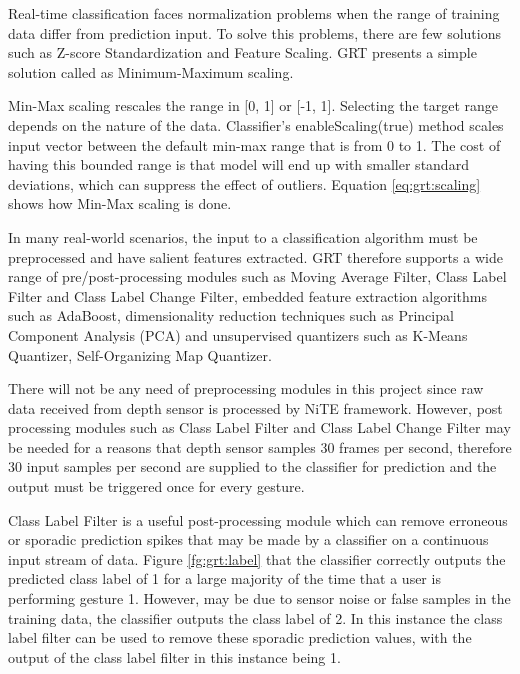 Real-time classification faces normalization problems when the range of training data differ from prediction input. To solve this problems, there are few solutions such as Z-score Standardization and Feature Scaling. GRT presents a simple solution called as Minimum-Maximum scaling.

Min-Max scaling rescales the range in [0, 1] or [-1, 1]. Selecting the target range depends on the nature of the data. Classifier's enableScaling(true) method scales input vector between the default min-max range that is from 0 to 1. The cost of having this bounded range is that model will end up with smaller standard deviations, which can suppress the effect of outliers. Equation \ref{eq:grt:scaling} shows how Min-Max scaling is done.



In many real-world scenarios, the input to a classification algorithm must be preprocessed and have salient features extracted. GRT therefore supports a wide range of pre/post-processing modules such as Moving Average Filter, Class Label Filter and Class Label Change Filter, embedded feature extraction algorithms such as AdaBoost, dimensionality reduction techniques such as Principal Component Analysis (PCA) and unsupervised quantizers such as K-Means Quantizer, Self-Organizing Map Quantizer.

There will not be any need of preprocessing modules in this project since raw data received from depth sensor is processed by NiTE framework. However, post processing modules such as Class Label Filter and Class Label Change Filter may be needed for a reasons that depth sensor samples 30 frames per second, therefore 30 input samples per second are supplied to the classifier for prediction and the output must be triggered once for every gesture. 



Class Label Filter is a useful post-processing module which can remove erroneous or sporadic prediction spikes that may be made by a classifier on a continuous input stream of data. Figure \ref{fg:grt:label} that the classifier correctly outputs the predicted class label of 1 for a large majority of the time that a user is performing gesture 1. However, may be due to sensor noise or false samples in the training data, the classifier outputs the class label of 2. In this instance the class label filter can be used to remove these sporadic prediction values, with the output of the class label filter in this instance being 1. 

